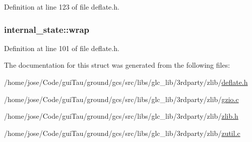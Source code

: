 Definition at line 123 of file deflate.\-h.

\hypertarget{structinternal__state_ae80327ea7ad4ad0ef5baeef5ef3a6807}{
\subsubsection[{wrap}]{ internal\-\_\-state\-::wrap}}\label{structinternal__state_ae80327ea7ad4ad0ef5baeef5ef3a6807}


Definition at line 101 of file deflate.\-h.



The documentation for this struct was generated from the following files\-:\begin{DoxyCompactItemize}
\item 
/home/jose/\-Code/gui\-Tau/ground/gcs/src/libs/glc\-\_\-lib/3rdparty/zlib/\hyperlink{deflate_8h}{deflate.\-h}\item 
/home/jose/\-Code/gui\-Tau/ground/gcs/src/libs/glc\-\_\-lib/3rdparty/zlib/\hyperlink{gzio_8c}{gzio.\-c}\item 
/home/jose/\-Code/gui\-Tau/ground/gcs/src/libs/glc\-\_\-lib/3rdparty/zlib/\hyperlink{zlib_8h}{zlib.\-h}\item 
/home/jose/\-Code/gui\-Tau/ground/gcs/src/libs/glc\-\_\-lib/3rdparty/zlib/\hyperlink{zutil_8c}{zutil.\-c}\end{DoxyCompactItemize}
